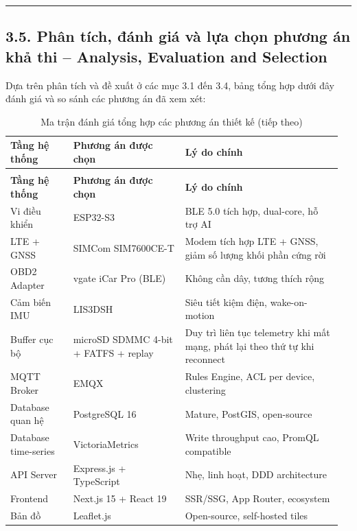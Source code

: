\documentclass[a4paper]{extarticle}
\newcommand{\thesissettableid}[2]{%
  \renewcommand{\thetable}{#1}%
  \renewcommand{\theHtable}{#2}%
}
\begin{document}
\begin{center}\rule{0.5\linewidth}{0.5pt}\end{center}

\subsection{3.5. Phân tích, đánh giá và lựa chọn phương án khả thi --
Analysis, Evaluation and
Selection}\label{33-phuxe2n-tuxedch-ux111uxe1nh-giuxe1-vuxe0-lux1ef1a-chux1ecdn-phux1b0ux1a1ng-uxe1n-khux1ea3-thi--analysis-evaluation-and-selection}

Dựa trên phân tích và đề xuất ở các mục 3.1 đến 3.4, bảng tổng hợp dưới
đây đánh giá và so sánh các phương án đã xem xét:


{\thesissettableid{3.29}{tab-ch3-ma-tran-anh-gia-tong-hop-cac-phuong-an-thiet-ke}
\def\LTcaptype{table}
\begin{longtable}{|L{0.185\linewidth}|L{0.320\linewidth}|L{0.459\linewidth}|}
\caption{Ma trận đánh giá tổng hợp các phương án thiết kế}\label{tab:ch3-ma-tran-anh-gia-tong-hop-cac-phuong-an-thiet-ke}\\
\hline \textbf{Tầng hệ thống} & \textbf{Phương án được chọn} & \textbf{Lý do chính} \\
\hline
\endfirsthead
\caption[]{Ma trận đánh giá tổng hợp các phương án thiết kế (tiếp theo)}\\
\hline \textbf{Tầng hệ thống} & \textbf{Phương án được chọn} & \textbf{Lý do chính} \\
\hline
\endhead
\hline
\endfoot
\endlastfoot
Vi điều khiển & ESP32-S3 & BLE 5.0 tích hợp, dual-core, hỗ trợ AI \\\hline
LTE + GNSS & SIMCom SIM7600CE-T & Modem tích hợp LTE + GNSS, giảm số
lượng khối phần cứng rời \\\hline
OBD2 Adapter & vgate iCar Pro (BLE) & Không cần dây, tương thích rộng \\\hline
Cảm biến IMU & LIS3DSH & Siêu tiết kiệm điện, wake-on-motion \\\hline
Buffer cục bộ & microSD SDMMC 4-bit + FATFS + replay & Duy trì liên tục
telemetry khi mất mạng, phát lại theo thứ tự khi reconnect \\\hline
MQTT Broker & EMQX & Rules Engine, ACL per device, clustering \\\hline
Database quan hệ & PostgreSQL 16 & Mature, PostGIS, open-source \\\hline
Database time-series & VictoriaMetrics & Write throughput cao, PromQL
compatible \\\hline
API Server & Express.js + TypeScript & Nhẹ, linh hoạt, DDD
architecture \\\hline
Frontend & Next.js 15 + React 19 & SSR/SSG, App Router, ecosystem \\\hline
Bản đồ & Leaflet.js & Open-source, self-hosted tiles \\\hline
\end{longtable}
}
\end{document}
